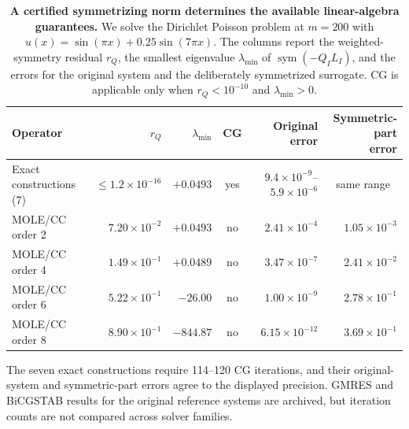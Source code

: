 \documentclass[lineno,pdflatex,sn-nature]{sn-jnl}
\theoremstyle{thmstyleone}
\begin{document}
\begin{table}[!htbp]
\caption{\textbf{A certified symmetrizing norm determines the available linear-algebra guarantees.} We solve the Dirichlet Poisson problem at $m=200$ with $u(x)=\sin(\pi x)+0.25\sin(7\pi x)$. The columns report the weighted-symmetry residual $r_Q$, the smallest eigenvalue $\lambda_{\min}$ of $\operatorname{sym}(-Q_IL_I)$, and the errors for the original system and the deliberately symmetrized surrogate. CG is applicable only when $r_Q<10^{-10}$ and $\lambda_{\min}>0$.}
\label{t:solver}
\centering
\footnotesize
\setlength{\tabcolsep}{3.6pt}
\renewcommand{\arraystretch}{1.08}
\begin{tabular*}{\textwidth}{@{\extracolsep{\fill}}lrrcrr@{}}
\toprule
Operator & $r_Q$ & $\lambda_{\min}$ & CG & \shortstack[c]{Original\\error} & \shortstack[c]{Symmetric-part\\error} \\
\midrule
Exact constructions (7) & $\leq1.2\times10^{-16}$ & $+0.0493$ & yes & $9.4\times10^{-9}$--$5.9\times10^{-6}$ & \multicolumn{1}{c}{same range} \\
\midrule
MOLE/CC order 2 & $7.20\times10^{-2}$ & $+0.0493$ & no & $2.41\times10^{-4}$ & $1.05\times10^{-3}$ \\
MOLE/CC order 4 & $1.49\times10^{-1}$ & $+0.0489$ & no & $3.47\times10^{-7}$ & $2.41\times10^{-2}$ \\
MOLE/CC order 6 & $5.22\times10^{-1}$ & $-26.00$ & no & $1.00\times10^{-9}$ & $2.78\times10^{-1}$ \\
MOLE/CC order 8 & $8.90\times10^{-1}$ & $-844.87$ & no & $6.15\times10^{-12}$ & $3.69\times10^{-1}$ \\
\bottomrule
\end{tabular*}

\vspace{4pt}
\footnotesize The seven exact constructions require 114--120 CG iterations, and their original-system and symmetric-part errors agree to the displayed precision. GMRES and BiCGSTAB results for the original reference systems are archived, but iteration counts are not compared across solver families.
\end{table}
\end{document}
